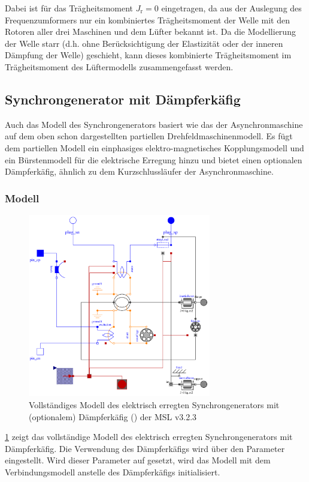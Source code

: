 Dabei ist für das Trägheitsmoment \(J_{\mathrm{r}}=0\) eingetragen, da aus der Auslegung des Frequenzumformers nur ein kombiniertes Trägheitsmoment der Welle mit den Rotoren aller drei Maschinen und dem Lüfter bekannt ist. Da die Modellierung der Welle starr (d.h. ohne Berücksichtigung der Elastizität oder der inneren Dämpfung der Welle) geschieht, kann dieses kombinierte Trägheitsmoment im Trägheitsmoment des Lüftermodells zusammengefasst werden.

\subsection{Synchrongenerator mit Dämpferkäfig}\label{sec:synchrongenerator}

Auch das Modell des Synchrongenerators basiert wie das der Asynchronmaschine auf dem oben schon dargestellten partiellen Drehfeldmaschinenmodell. Es fügt dem partiellen Modell ein einphasiges elektro-magnetisches Kopplungsmodell und ein Bürstenmodell für die elektrische Erregung hinzu und bietet einen optionalen Dämpferkäfig, ähnlich zu dem Kurzschlussläufer der Asynchronmaschine.

\hypertarget{sec:Modell-SG}{%
\subsubsection{Modell}\label{sec:Modell-SG}}
\begin{figure}
    \centering
    \includegraphics[height=8cm]{Bilder/SM_ElectricalExcited.pdf}
    \caption{Vollständiges Modell des elektrisch erregten Synchrongenerators mit (optionalem) Dämpferkäfig () der MSL v3.2.3}
    \label{fig:Synchrongenerator}
\end{figure}
\cref{fig:Synchrongenerator} zeigt das vollständige Modell des elektrisch erregten Synchrongenerators mit Dämpferkäfig. Die Verwendung des Dämpferkäfigs wird über den Parameter  eingestellt. Wird dieser Parameter auf  gesetzt, wird das Modell mit dem Verbindungsmodell  anstelle des Dämpferkäfigs initialisiert. 



